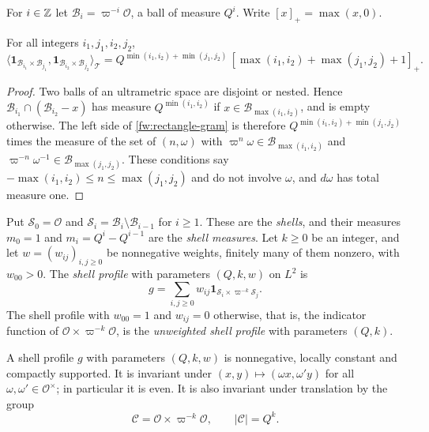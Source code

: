 For $i\in\mathbb Z$ let $\mathcal B_i=\varpi^{-i}\mathcal O$, a ball of measure
$Q^i$. Write $[x]_+=\max(x,0)$.

\begin{lemma}\label{fw:gram-lemma}
For all integers $i_1,j_1,i_2,j_2$,
\begin{equation}\label{fw:rectangle-gram}
 \bigl\langle\mathbf 1_{\mathcal B_{i_1}\times\mathcal B_{j_1}},
 \mathbf 1_{\mathcal B_{i_2}\times\mathcal B_{j_2}}\bigr\rangle_{\mathcal T}
 =Q^{\min(i_1,i_2)+\min(j_1,j_2)}\,
 [\max(i_1,i_2)+\max(j_1,j_2)+1]_+.
\end{equation}
\end{lemma}

\begin{proof}
Two balls of an ultrametric space are disjoint or nested. Hence
$\mathcal B_{i_1}\cap(\mathcal B_{i_2}-x)$ has measure
$Q^{\min(i_1,i_2)}$ if $x\in\mathcal B_{\max(i_1,i_2)}$, and is empty
otherwise. The left side of \eqref{fw:rectangle-gram} is therefore
$Q^{\min(i_1,i_2)+\min(j_1,j_2)}$ times the measure of the set of
$(n,\omega)$ with $\varpi^n\omega\in\mathcal B_{\max(i_1,i_2)}$ and
$\varpi^{-n}\omega^{-1}\in\mathcal B_{\max(j_1,j_2)}$. These conditions
say $-\max(i_1,i_2)\le n\le\max(j_1,j_2)$ and do not involve $\omega$,
and $d\omega$ has total measure one.
\end{proof}

\begin{definition}\label{fw:shell-profile}
Put $\mathcal S_0=\mathcal O$ and $\mathcal S_i=\mathcal B_i\setminus
\mathcal B_{i-1}$ for $i\ge1$. These are the \emph{shells}, and their
measures $m_0=1$ and $m_i=Q^i-Q^{i-1}$ are the \emph{shell measures}.
Let $k\ge0$ be an integer, and let $w=(w_{ij})_{i,j\ge0}$ be nonnegative
weights, finitely many of them nonzero, with $w_{00}>0$. The
\emph{shell profile} with parameters $(Q,k,w)$ on $L^2$ is
\[
 g=\sum_{i,j\ge0}w_{ij}\mathbf 1_{\mathcal S_i\times\varpi^{-k}\mathcal S_j}.
\]
The shell profile with $w_{00}=1$ and $w_{ij}=0$ otherwise, that is, the
indicator function of $\mathcal O\times\varpi^{-k}\mathcal O$, is the
\emph{unweighted shell profile} with parameters $(Q,k)$.
\end{definition}

\begin{lemma}\label{fw:shell-invariance}
A shell profile $g$ with parameters $(Q,k,w)$ is nonnegative, locally
constant and compactly supported. It is invariant under
$(x,y)\mapsto(\omega x,\omega'y)$ for all $\omega,\omega'\in\mathcal
O^\times$; in particular it is even. It is also invariant under
translation by the group
\begin{equation}\label{fw:hard-period}
 \mathcal C=\mathcal O\times\varpi^{-k}\mathcal O,\qquad |\mathcal C|=Q^k.
\end{equation}
\end{lemma}

